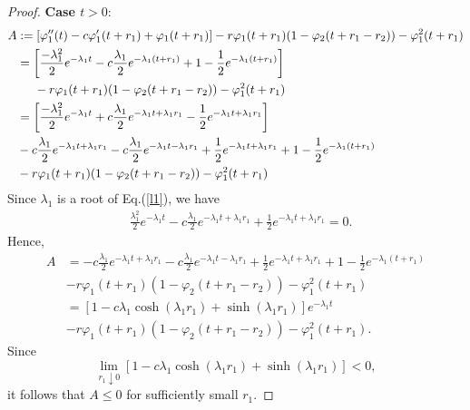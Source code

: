 \documentclass[12pt,letterpaper]{amsart}
\theoremstyle{definition}
\theoremstyle{remark}
\numberwithin{equation}{section}
\begin{document}
\begin{proof}
\medskip
{\bf Case  $t>0$}:
\begin{align*}
A&:= \left[
\varphi_{1}^{\prime\prime}(t)-c\varphi_{1}^{\prime}(t+r_1)+\varphi
_{1}(t+r_1)\right]  -r\varphi_{1}(t+r_1)(1-\varphi_{2}(t+r_1-r_2))-\varphi_{1}^{2}(t+r_1)\\
&  = \left[  \frac{-\lambda_{1}^{2}}{2}e^{-\lambda_{1}t}-c\frac{\lambda_{1}} 
{2}e^{-\lambda_{1}(t+r_1)}+1-\frac{1}{2}e^{-\lambda_{1}(t+r_1)}\right]  \\
& \hspace{.5cm}-r\varphi_{1}(t+r_1)(1-\varphi_{2}(t+r_1-r_2))-\varphi_{1}^{2}(t+r_1)\\
 &=  \left[  \frac{-\lambda_{1}^{2}}{2}e^{-\lambda_{1}t}+c\frac{\lambda_{1}} 
{2}e^{-\lambda_{1}t+\lambda_1 r_1}-\frac{1}{2}e^{-\lambda_{1}t+\lambda_1r_1}\right] \\
& -c\frac{\lambda_{1}} 
{2}e^{-\lambda_{1}t+\lambda_1 r_1} -c\frac{\lambda_{1}} 
{2}e^{-\lambda_{1}t-\lambda_1 r_1} +\frac{1}{2}e^{-\lambda_{1}t+\lambda_1 r_1} +1-\frac{1}{2}e^{-\lambda_{1}(t+r_1)} \\
&-r\varphi_{1}(t+r_1)(1-\varphi_{2}(t+r_1-r_2))-\varphi_{1}^{2}(t+r_1) 
 \end{align*}
Since $\lambda_1$ is a root of Eq.(\ref{l1}), we have
\begin{align*}
&  \frac{\lambda_{1}^{2}}{2}e^{-\lambda_{1}t}-c\frac{\lambda_{1}} 
{2}e^{-\lambda_{1}t+\lambda_1 r_1}+\frac{1}{2}e^{-\lambda_{1}t+\lambda_1r_1}=0.
\end{align*}
Hence,
\begin{align*}
A&= -c\frac{\lambda_{1}} 
{2}e^{-\lambda_{1}t+\lambda_1 r_1} -c\frac{\lambda_{1}} 
{2}e^{-\lambda_{1}t-\lambda_1 r_1} +\frac{1}{2}e^{-\lambda_{1}t+\lambda_1 r_1} +1-\frac{1}{2}e^{-\lambda_{1}(t+r_1)} \\
&-r\varphi_{1}(t+r_1)(1-\varphi_{2}(t+r_1-r_2))-\varphi_{1}^{2}(t+r_1) \\
&= \left[ 1-c\lambda_1 \cosh(\lambda_1r_1)+\sinh(\lambda_1r_1)\right] e^{-\lambda_1 t} \\
& -r\varphi_{1}(t+r_1)(1-\varphi_{2}(t+r_1-r_2))-\varphi_{1}^{2}(t+r_1).
\end{align*}
Since
$$
\lim_{r_1\downarrow 0} \left[ 1-c\lambda_1 \cosh(\lambda_1r_1)+\sinh(\lambda_1r_1)\right] <0,
$$
it follows that $A\le 0$ for sufficiently small $r_1$.


\end{proof}
\end{document}
